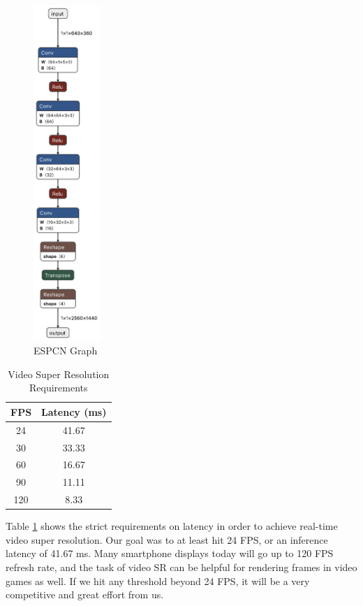\documentclass{article}
\begin{document}
\begin{figure}
    \centerline{\includegraphics[width=1in]{../final/figures/espcn_graph.png}}
    \caption{ESPCN Graph}
    \label{fig:espcn-graph}
\end{figure}

\begin{table}[ht]
\caption{Video Super Resolution Requirements} %
\centering %
\begin{tabular}{c c} %
\hline\hline %
FPS & Latency (ms) \\ [0.5ex] %
\hline %
24 & 41.67 \\
30 & 33.33 \\
60 & 16.67 \\
90 & 11.11 \\
120 & 8.33 \\
[1ex] %
\hline %
\end{tabular}
\label{table:fps} %
\end{table}

Table \ref{table:fps} shows the strict requirements on latency in order to achieve real-time video super resolution. Our goal was to at least hit 24 FPS, or an inference latency of 41.67 ms. Many smartphone displays today will go up to 120 FPS refresh rate, and the task of video SR can be helpful for rendering frames in video games as well. If we hit any threshold beyond 24 FPS, it will be a very competitive and great effort from us. 
\end{document}

